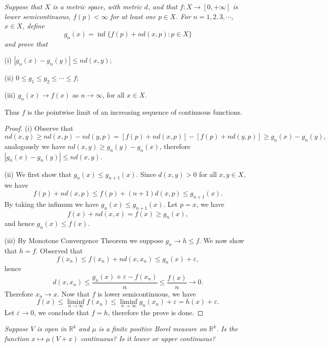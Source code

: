 \begin{problem}\em
Suppose that $X$ is a metric space, with metric $d$, and that $f:X\to[0,+\infty]$ is lower semicontinuous, $f(p)<\infty$ for at least one $p\in X$. For $n=1,2,3,\cdots$, $x\in X$, define 
$$g_n(x)=\inf\{f(p)+nd(x,p):p\in X\}$$
and prove that\par
(i) $|g_n(x)-g_n(y)|\le nd(x,y)$;\par
(ii) $0\le g_1\le g_2\le\cdots\le f$;\par
(iii) $g_n(x)\to f(x)$ as $n\to\infty$, for all $x\in X$.\par
Thus $f$ is the pointwise limit of an increasing sequence of continuous functions.
\end{problem}
\begin{proof}
(i) Observe that 
$$
nd\left( x,y \right) \ge nd\left( x,p \right) -nd\left( y,p \right) =\left[ f\left( p \right) +nd\left( x,p \right) \right] -\left[ f\left( p \right) +nd\left( y,p \right) \right] \ge g_n\left( x \right) -g_n\left( y \right) ,
$$
analogously we have $nd\left( x,y \right) \ge g_n\left( y \right) -g_n\left( x \right) $, therefore $|g_n(x)-g_n(y)|\le nd(x,y)$.\par
(ii) We first show that $g_n(x)\le g_{n+1}(x)$. Since $d(x,y)>0$ for all $x,y\in X$, we have 
$$
f\left( p \right) +nd\left( x,p \right) \le f\left( p \right) +\left( n+1 \right) d\left( x,p \right) \le g_{n+1}\left( x \right) .
$$
By taking the infimum we have $g_n(x)\le g_{n+1}(x)$. Let $p=x$, we have 
$$
f\left( x \right) +nd\left( x,x \right) =f\left( x \right) \ge g_n\left( x \right) ,
$$
and hence $g_n(x)\le f(x)$.\par
(iii) By Monotone Convergence Theorem we suppose $g_n\to h\le f$. We now show that $h=f$. Observed that 
$$
f\left( x_n \right) \le f\left( x_n \right) +nd\left( x,x_n \right) \le g_n\left( x \right) +\varepsilon ,
$$
hence 
$$
d\left( x,x_n \right) \le \frac{g_n\left( x \right) +\varepsilon -f\left( x_n \right)}{n}\le \frac{f\left( x \right)}{n}\rightarrow 0.
$$
Therefore $x_n\to x$. Now that $f$ is lower semicontinuous, we have 
$$f(x)\le\liminf_{n\to\infty}f(x_n)\le\liminf_{n\to\infty}g_n(x_n)+\varepsilon=h(x)+\varepsilon.$$
Let $\varepsilon\to 0$, we conclude that $f=h$, therefore the prove is done.
\end{proof}
\begin{problem}\em
Suppose $V$ is open in $\mathbb{R}^k$ and $\mu$ is a finite positive Borel measure on $\mathbb{R}^k$. Is the function $x\mapsto\mu(V+x)$ continuous? Is it lower or upper continuous?
\end{problem}

